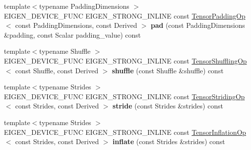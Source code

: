 \begin{DoxyCompactItemize}
\mbox{\label{class_eigen_1_1_tensor_base_3_01_derived_00_01_read_only_accessors_01_4_a7faea27dc1ff694e61c2de5432966be6}} 
{\footnotesize template$<$typename Padding\+Dimensions $>$ }\\E\+I\+G\+E\+N\+\_\+\+D\+E\+V\+I\+C\+E\+\_\+\+F\+U\+NC E\+I\+G\+E\+N\+\_\+\+S\+T\+R\+O\+N\+G\+\_\+\+I\+N\+L\+I\+NE const \hyperlink{class_eigen_1_1_tensor_padding_op}{Tensor\+Padding\+Op}$<$ const Padding\+Dimensions, const Derived $>$ {\bfseries pad} (const Padding\+Dimensions \&padding, const Scalar padding\+\_\+value) const
\item 
\mbox{\label{class_eigen_1_1_tensor_base_3_01_derived_00_01_read_only_accessors_01_4_a8f95389e36916928724d6531f2685730}} 
{\footnotesize template$<$typename Shuffle $>$ }\\E\+I\+G\+E\+N\+\_\+\+D\+E\+V\+I\+C\+E\+\_\+\+F\+U\+NC E\+I\+G\+E\+N\+\_\+\+S\+T\+R\+O\+N\+G\+\_\+\+I\+N\+L\+I\+NE const \hyperlink{class_eigen_1_1_tensor_shuffling_op}{Tensor\+Shuffling\+Op}$<$ const Shuffle, const Derived $>$ {\bfseries shuffle} (const Shuffle \&shuffle) const
\item 
\mbox{\label{class_eigen_1_1_tensor_base_3_01_derived_00_01_read_only_accessors_01_4_abbbbea637e938f713bde4752a9bdd49c}} 
{\footnotesize template$<$typename Strides $>$ }\\E\+I\+G\+E\+N\+\_\+\+D\+E\+V\+I\+C\+E\+\_\+\+F\+U\+NC E\+I\+G\+E\+N\+\_\+\+S\+T\+R\+O\+N\+G\+\_\+\+I\+N\+L\+I\+NE const \hyperlink{class_eigen_1_1_tensor_striding_op}{Tensor\+Striding\+Op}$<$ const Strides, const Derived $>$ {\bfseries stride} (const Strides \&strides) const
\item 
\mbox{\label{class_eigen_1_1_tensor_base_3_01_derived_00_01_read_only_accessors_01_4_a394ca76f68fdb64aee1efaf9a3728195}} 
{\footnotesize template$<$typename Strides $>$ }\\E\+I\+G\+E\+N\+\_\+\+D\+E\+V\+I\+C\+E\+\_\+\+F\+U\+NC E\+I\+G\+E\+N\+\_\+\+S\+T\+R\+O\+N\+G\+\_\+\+I\+N\+L\+I\+NE const \hyperlink{class_eigen_1_1_tensor_inflation_op}{Tensor\+Inflation\+Op}$<$ const Strides, const Derived $>$ {\bfseries inflate} (const Strides \&strides) const

\end{DoxyCompactItemize}
